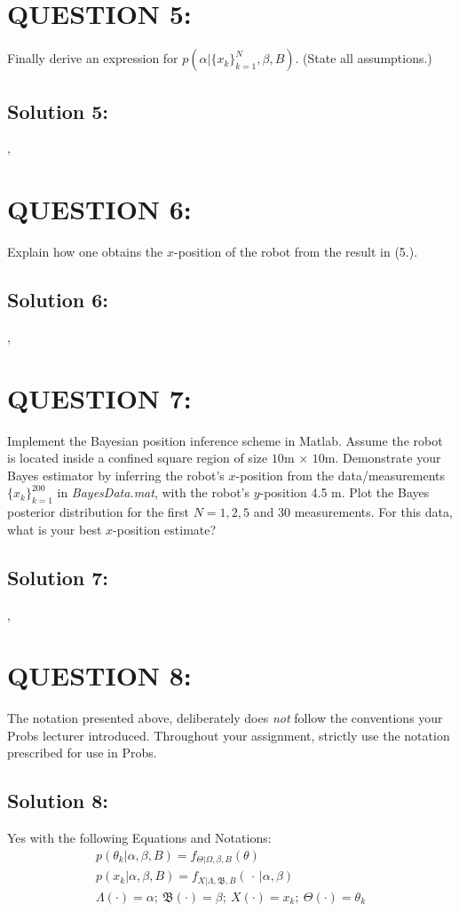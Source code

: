 \documentclass[a4paper,11pt]{article}
\begin{document}
\section{QUESTION 5:}
Finally derive an expression for $p(\alpha | \{x_k\}^N _{k = 1}, \beta, B)$. (State all assumptions.)

\subsection{Solution 5:}
,

\section{QUESTION 6:}
Explain how one obtains the $x$-position of the robot from the result in (5.).

\subsection{Solution 6:}
,

\section{QUESTION 7:}
Implement the Bayesian position inference scheme in Matlab. Assume the robot is
located inside a confined square region of size $10$m $\times$ $10$m. Demonstrate your Bayes
estimator by inferring the robot’s $x$-position from the data/measurements $\{ x_k \}^{200} _{k = 1}$ in \emph{BayesData.mat}, with the robot’s $y$-position 4.5 m. Plot the Bayes posterior distribution for the first $N = 1, 2, 5$ and $30$ measurements. For this data, what is your best $x$-position estimate?

\subsection{Solution 7:}
,

\section{QUESTION 8:}
The notation presented above, deliberately does \emph{not} follow the conventions your Probs
lecturer introduced. Throughout your assignment, strictly use the notation prescribed for
use in Probs.
\subsection{Solution 8:}
Yes with the following Equations and Notations: 
 	\begin{eqnarray}
		p(\theta_k | \alpha, \beta, B) = f_{\Theta | \Omega, \beta, B}(\theta)\\
		p(x_k |\alpha, \beta, B) = f_{X | \Lambda, \mathfrak{B}, B}(\, \cdot \, | \alpha, \beta)\\
		\Lambda (\cdot) = \alpha;\: \mathfrak{B}(\cdot) = \beta ; \: X(\cdot) = x_k; \: \Theta ( \cdot) = \theta_k 
	\end{eqnarray}
\end{document}
